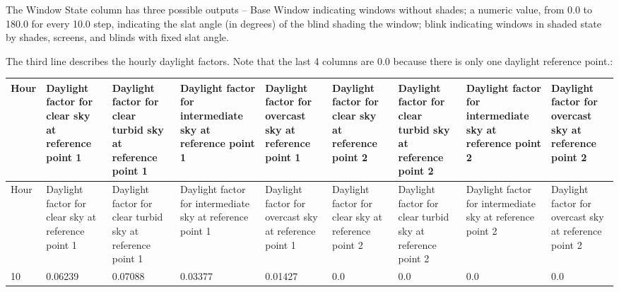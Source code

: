 The Window State column has three possible outputs -- Base Window indicating windows without shades; a numeric value, from 0.0 to 180.0 for every 10.0 step, indicating the slat angle (in degrees) of the blind shading the window; blink indicating windows in shaded state by shades, screens, and blinds with fixed slat angle.

The third line describes the hourly daylight factors. Note that the last 4 columns are 0.0 because there is only one daylight reference point.:

\begin{longtable}[c]{p{0.66in}p{0.66in}p{0.66in}p{0.66in}p{0.66in}p{0.66in}p{0.66in}p{0.66in}p{0.66in}}
\toprule 
Hour & Daylight factor for clear sky at reference point 1 & Daylight factor for clear turbid sky at reference point 1 & Daylight factor for intermediate sky at reference point 1 & Daylight factor for overcast sky at reference point 1 & Daylight factor for clear sky at reference point 2 & Daylight factor for clear turbid sky at reference point 2 & Daylight factor for intermediate sky at reference point 2 & Daylight factor for overcast sky at reference point 2 \tabularnewline
\midrule
\endfirsthead

\toprule 
Hour & Daylight factor for clear sky at reference point 1 & Daylight factor for clear turbid sky at reference point 1 & Daylight factor for intermediate sky at reference point 1 & Daylight factor for overcast sky at reference point 1 & Daylight factor for clear sky at reference point 2 & Daylight factor for clear turbid sky at reference point 2 & Daylight factor for intermediate sky at reference point 2 & Daylight factor for overcast sky at reference point 2 \tabularnewline
\midrule
\endhead

10 & 0.06239 & 0.07088 & 0.03377 & 0.01427 & 0.0 & 0.0 & 0.0 & 0.0 \tabularnewline
\bottomrule
\end{longtable}
